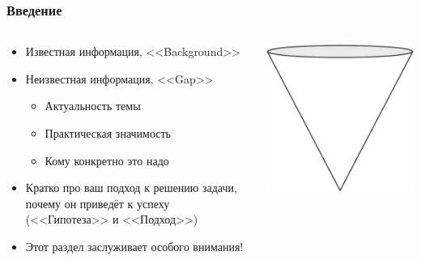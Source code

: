 \documentclass[xetex,mathserif,serif]{beamer}
\begin{document}
    \begin{frame}
        \frametitle{Введение}
        \begin{columns}
            \begin{column}{0.6\textwidth}
                \begin{itemize}
                    \item Известная информация, <<Background>>
                    \item Неизвестная информация, <<Gap>>
                    \begin{itemize}
                        \item Актуальность темы
                        \item Практическая значимость
                        \item Кому конкретно это надо
                    \end{itemize}
                    \item Кратко про ваш подход к решению задачи, почему он приведёт к успеху (<<Гипотеза>> и <<Подход>>)
                    \item Этот раздел заслуживает особого внимания!
                \end{itemize}
            \end{column}
            \begin{column}{0.4\textwidth}
                \begin{center}
                    \includegraphics[width=\textwidth]{introductionCone.png}
                \end{center}
            \end{column}
        \end{columns}
    \end{frame}
\end{document}

